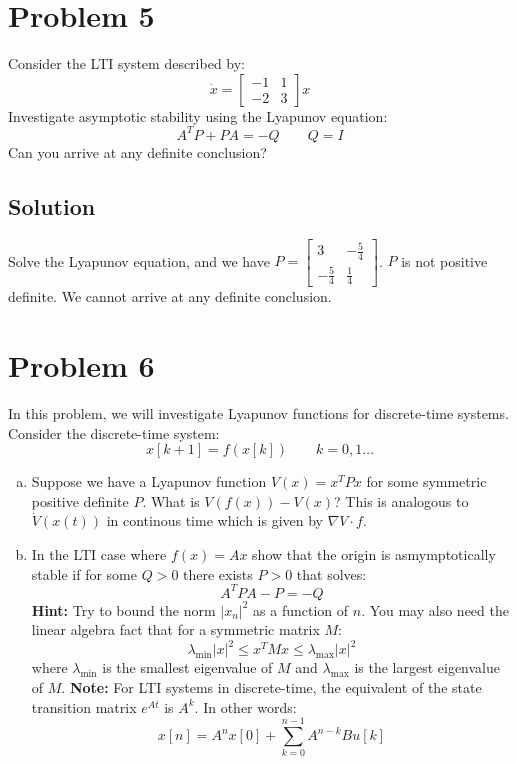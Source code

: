 \documentclass[11pt]{report}
\theoremstyle{definition}
\newcommand{\xlr}[2]{#1 \left(#2\right)}
\newcommand{\clr}[2]{#1 \left[#2 \right]}
\begin{document}
\section*{Problem 5}
Consider the LTI system described by:
$$
\dot x = \begin{bmatrix} -1 &1 \\ -2 &3  \end{bmatrix} x
$$
Investigate asymptotic stability using the Lyapunov equation:
$$
A ^T P + PA = -Q \qquad Q = I
$$
Can you arrive at any definite conclusion?

\subsection*{Solution}
Solve the Lyapunov equation, and we have $P = \begin{bmatrix} 3 &-\frac{5}{4}\\ -\frac{5}{4} &\frac{1}{4} \end{bmatrix}$. $P$ is not positive definite. We cannot arrive at any definite conclusion.

\section*{Problem 6}
In this problem, we will investigate Lyapunov functions for discrete-time systems. Consider the discrete-time system:
$$
\clr{x}{k+1} = \xlr{f}{\clr{x}{k}} \qquad k = 0, 1 \dots
$$
\begin{enumerate}[(a), noitemsep]
\item Suppose we have a Lyapunov function $\xlr{V}{x} = x^T P x$ for some symmetric positive definite $P$. What is $\xlr{V}{\xlr{f}{x}} - \xlr{V}{x}$? This is analogous to $ \xlr{\dot V}{\xlr{x}{t}}$ in continous time which is given by $\nabla V \cdot f$.
\item In the LTI case where $\xlr{f}{x} = A x$ show that the origin is asmymptotically stable if for some $Q >0$ there exists $P >0$ that solves:
$$A^TPA - P = -Q$$
\justify
\textbf{Hint:} Try to bound the norm $| x_n |^2$ as a function of $n$. You may also need the linear algebra fact that for a symmetric matrix $M$:
$$
\lambda_{\textrm{min}} |x|^2 \le x^T M x \le \lambda_{\textrm{max}} |x|^2
$$
where $\lambda_{\textrm{min}}$ is the smallest eigenvalue of $M$ and $\lambda_{\textrm{max}}$ is the largest eigenvalue of $M$.
\textbf{Note:} For LTI systems in discrete-time, the equivalent of the state transition matrix $e^{At}$ is $A^k$. In other words:
$$
\clr{x}{n} = A^n \clr{x}{0} + \sum\limits_{k = 0}^{n - 1} {{A^{n - k}}Bu\left[ k \right]}
$$
\end{enumerate}
\end{document}
